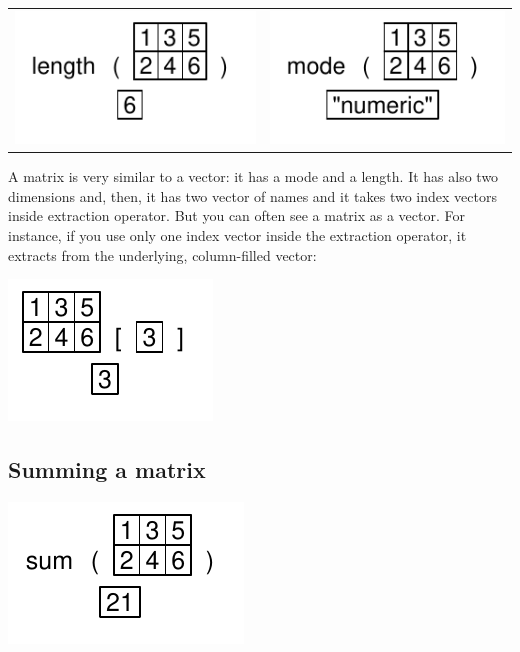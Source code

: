 \documentclass[pdflatex]{article}
\begin{document}
\begin{tabular}{cc}
\includegraphics{length_matrix.pdf} & \includegraphics{mode_matrix.pdf}
\end{tabular}

A matrix is very similar to a vector: it has a mode and a length. It has also
two dimensions and, then, it has two vector of names and it takes two index
vectors inside extraction operator. But you can often see a matrix as a vector.
For instance, if you use only one index vector inside the extraction operator,
it extracts from the underlying, column-filled vector:

\includegraphics{matrix_extraction_as_vector}

\subsection{Summing a matrix}

\includegraphics{matrix_sum} 
\end{document}
